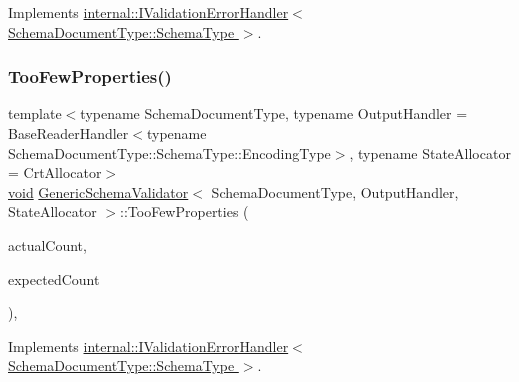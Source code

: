 Implements \hyperlink{classinternal_1_1IValidationErrorHandler_afc144690ba0e24636a72f541efd32c3b}{internal\+::\+I\+Validation\+Error\+Handler$<$ Schema\+Document\+Type\+::\+Schema\+Type $>$}.

\mbox{\label{classGenericSchemaValidator_aaebaf28aa289826a3c39dc953b0ca466}} 
\subsubsection{\texorpdfstring{Too\+Few\+Properties()}{TooFewProperties()}}
{\footnotesize\ttfamily template$<$typename Schema\+Document\+Type, typename Output\+Handler = Base\+Reader\+Handler$<$typename Schema\+Document\+Type\+::\+Schema\+Type\+::\+Encoding\+Type$>$, typename State\+Allocator = Crt\+Allocator$>$ \\
\hyperlink{imgui__impl__opengl3__loader_8h_ac668e7cffd9e2e9cfee428b9b2f34fa7}{void} \hyperlink{classGenericSchemaValidator}{Generic\+Schema\+Validator}$<$ Schema\+Document\+Type, Output\+Handler, State\+Allocator $>$\+::Too\+Few\+Properties (\begin{DoxyParamCaption}\item[{\hyperlink{rapidjson_8h_a5ed6e6e67250fadbd041127e6386dcb5}{Size\+Type}}]{actual\+Count,  }\item[{\hyperlink{rapidjson_8h_a5ed6e6e67250fadbd041127e6386dcb5}{Size\+Type}}]{expected\+Count }\end{DoxyParamCaption})\hspace{0.3cm}{\ttfamily [inline]}, {\ttfamily [virtual]}}



Implements \hyperlink{classinternal_1_1IValidationErrorHandler_adf515d2fad2e55bc0735a6fb16eec9e6}{internal\+::\+I\+Validation\+Error\+Handler$<$ Schema\+Document\+Type\+::\+Schema\+Type $>$}.

\mbox{\label{classGenericSchemaValidator_a227dce44e0684a73accbfb062200eb26}} 
